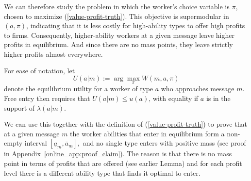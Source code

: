 \documentclass[12pt]{article}
\begin{document}
We can therefore study the problem in which the worker's choice variable is $\pi$, chosen to maximize (\ref{value-profit-truth}). This objective is supermodular in $(a,\pi)$, indicating that it is less costly for high-ability types to offer high profits to firms. Consequently, higher-ability workers at a given message leave higher profits in equilibrium. And since there are no mass points, they leave strictly higher profits almost everywhere.

For ease of notation, let 
\begin{equation}
U(a|m):=\arg \max_{\pi }W(m,a,\pi )  \label{value-profit-truth2}
\end{equation}%
denote the equilibrium utility for a worker of type $a$ who approaches message $m$. Free entry then requires that $U(a|m)\leq u(a)$, with equality if $a$ is in the support of $\lambda(a|m)$.

We can use this together with the definition of (\ref{value-profit-truth})
to prove that at a given message $m$ the worker abilities that enter in
equilibrium form a non-empty interval $[\underline{a}_{m},\bar{a}_{m}],$ and
no single type enters with positive mass (see proof in Appendix~\ref{online_app:proof_claim}). The
reason is that there is no mass point in terms of profits that are offered
(see earlier Lemma) and for each profit level there is a
different ability type that finds it optimal to enter.
\end{document}
